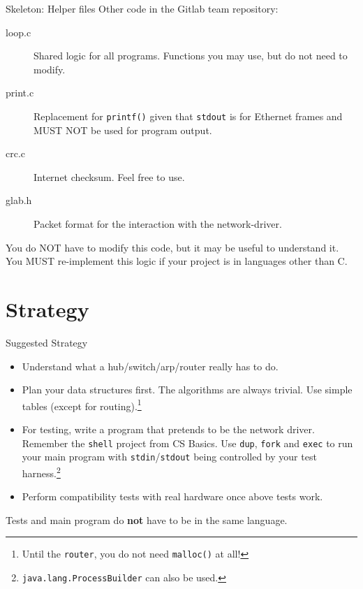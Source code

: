 \documentclass{beamer}
\begin{document}
\begin{frame}{Skeleton: Helper files}
Other code in the Gitlab team repository:
\begin{description}
\item[loop.c] Shared logic for all programs. Functions you may use, but
   do not need to modify.
\item[print.c] Replacement for {\tt printf()} given that {\tt stdout}
   is for Ethernet frames and MUST NOT be used for program output.
\item[crc.c] Internet checksum. Feel free to use.
\item[glab.h] Packet format for the interaction with the network-driver.
\end{description}
You do NOT have to modify this code, but it may be useful to understand
it. You MUST re-implement this logic if your project is in languages
other than C.
\end{frame}


\section{Strategy}

\begin{frame}{Suggested Strategy}
\begin{itemize}
\item Understand what a hub/switch/arp/router really has to do.
\item Plan your data structures first. The algorithms are always trivial.
      Use simple tables (except for routing).\footnote{Until the {\tt router},
      you do not need {\tt malloc()} at all!}
\item For testing, write a program that pretends to be the network driver.
      Remember the {\tt shell} project from CS Basics. Use {\tt dup}, {\tt fork}
      and {\tt exec} to run your main program with {\tt stdin}/{\tt stdout}
      being controlled by your test harness.\footnote{{\tt java.lang.ProcessBuilder}
      can also be used.}
\item Perform compatibility tests with real hardware once above tests work.
\end{itemize}
Tests and main program do {\bf not} have to be in the same language.
\end{frame}
\end{document}
